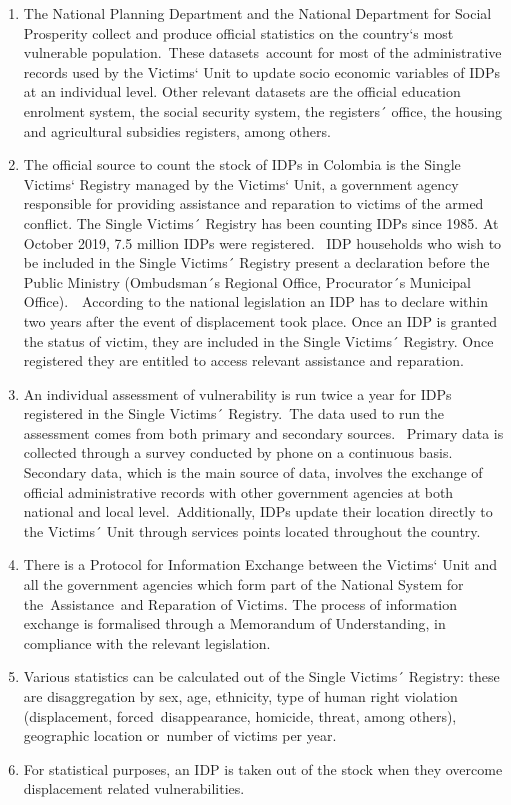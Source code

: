 \documentclass[
]{article}
\begin{document}
\begin{enumerate}
\def\labelenumi{\arabic{enumi}.}
\setcounter{enumi}{177}
\item
  The National Planning Department and the National Department for
  Social Prosperity collect and produce official statistics on the
  country`s most vulnerable population.~These datasets~account for
  most of the administrative records used by the Victims` Unit to
  update socio economic variables of IDPs at an individual level.
  Other relevant datasets are the official education enrolment system,
  the social security system, the registers´ office, the housing and
  agricultural subsidies registers, among others.~
\item
  The official source to count the stock of IDPs in Colombia is the
  Single Victims` Registry managed by the Victims` Unit, a
  government agency responsible for providing assistance and
  reparation to victims of the armed conflict. The Single Victims´
  Registry has been counting IDPs since 1985. At October 2019, 7.5
  million IDPs were registered.~ IDP households who wish to be
  included in the Single Victims´ Registry present a declaration
  before the Public Ministry (Ombudsman´s Regional Office,
  Procurator´s Municipal Office).~~According to the national
  legislation an IDP has to declare within two years after the event
  of displacement took place. Once an IDP is granted the status of
  victim, they are included in the Single Victims´ Registry. Once
  registered they are entitled to access relevant assistance and
  reparation.~
\item
  An individual assessment of vulnerability is run twice a year for
  IDPs registered in the Single Victims´ Registry.~The data used to
  run the assessment comes from both primary and secondary sources.~
  Primary data is collected through a survey conducted by phone on a
  continuous basis. Secondary data, which is the main source of data,
  involves the exchange of official administrative records with other
  government agencies at both national and local level.~Additionally,
  IDPs update their location directly to the Victims´ Unit through
  services points located throughout the country. ~
\item
  There is a Protocol for Information Exchange between the Victims`
  Unit and all the government agencies which form part of the National
  System for the~Assistance~and Reparation of Victims. The process of
  information exchange is formalised through a Memorandum of
  Understanding, in compliance with the relevant legislation.~
\item
  Various statistics can be calculated out of the Single Victims´
  Registry: these are disaggregation by sex, age, ethnicity, type of
  human right violation (displacement, forced~disappearance, homicide,
  threat, among others), geographic location or~number of victims per
  year.
\item
  For statistical purposes, an IDP is taken out of the stock when
  they overcome displacement related vulnerabilities.
\end{enumerate}
\end{document}
